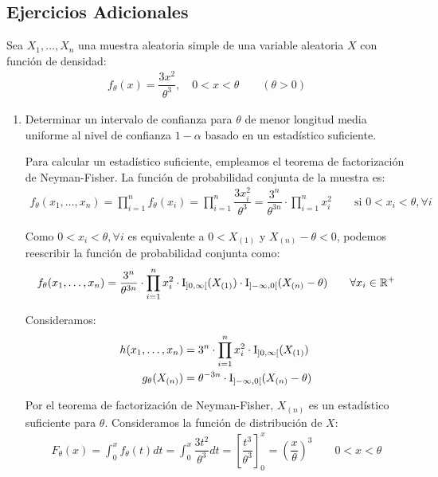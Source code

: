 \subsection*{Ejercicios Adicionales}

\begin{ejercicio}
    Sea $X_1, \ldots, X_n$ una muestra aleatoria simple de una variable aleatoria $X$ con función de densidad:
    \begin{align*}
        f_\theta(x) = \dfrac{3x^2}{\theta^3}, \quad 0 < x < \theta \qquad (\theta > 0)
    \end{align*}
    \begin{enumerate}
        \item Determinar un intervalo de confianza para $\theta$ de menor longitud media uniforme al nivel de confianza $1 - \alpha$ basado en un estadístico suficiente.
        
        Para calcular un estadístico suficiente, empleamos el teorema de factorización de Neyman-Fisher. La función de probabilidad conjunta de la muestra es:
        \begin{align*}
            f_\theta(x_1, \ldots, x_n) = \prod_{i=1}^{n} f_\theta(x_i) = \prod_{i=1}^{n} \dfrac{3x_i^2}{\theta^3} = \dfrac{3^n}{\theta^{3n}}\cdot \prod_{i=1}^{n} x_i^2\qquad \text{si } 0 < x_i < \theta, \forall i
        \end{align*}

        Como $0< x_i < \theta, \forall i$ es equivalente a $0<X_{(1)}$ y $X_{(n)}-\theta< 0$, podemos reescribir la función de probabilidad conjunta como:
        \begin{align*}
            f_\theta(x_1, \ldots, x_n) = \dfrac{3^n}{\theta^{3n}}\cdot \prod_{i=1}^{n} x_i^2\cdot \operatorname{I}_{\left]0, \infty\right[}(X_{(1)})\cdot \operatorname{I}_{\left]-\infty, 0\right[}(X_{(n)} - \theta)\qquad \forall x_i\in \mathbb{R}^+
        \end{align*}

        Consideramos:
        \begin{align*}
            h(x_1, \ldots, x_n) &= 3^n\cdot \prod_{i=1}^{n} x_i^2\cdot \operatorname{I}_{\left]0, \infty\right[}(X_{(1)})\\
            g_\theta(X_{(n)}) &= \theta^{-3n}\cdot \operatorname{I}_{\left]-\infty, 0\right[}(X_{(n)} - \theta)
        \end{align*}

        Por el teorema de factorización de Neyman-Fisher, $X_{(n)}$ es un estadístico suficiente para $\theta$. Consideramos la función de distribución de $X$:
        \begin{align*}
            F_\theta(x) = \int_{0}^{x} f_\theta(t) dt = \int_{0}^{x} \dfrac{3t^2}{\theta^3} dt = \left[\dfrac{t^3}{\theta^3}\right]_{0}^{x} = \left(\dfrac{x}{\theta}\right)^3\qquad 0 < x < \theta
        \end{align*}


\end{enumerate}
\end{ejercicio}
